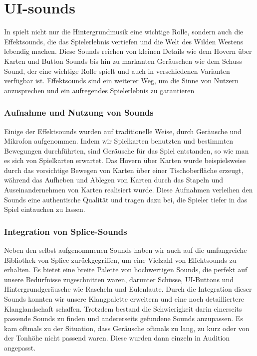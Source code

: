 
\section{UI-sounds}\label{sec:ui-sounds}

\renewcommand{\kapitelautor}{Autor: Nils Hubmann}

%
In \ff spielt nicht nur die Hintergrundmusik eine wichtige Rolle, sondern auch die Effektsounds, die das Spielerlebnis vertiefen und die Welt des Wilden Westens lebendig machen.
Diese Sounds reichen von kleinen Details wie dem Hovern über Karten und Button Sounds bis hin zu markanten Geräuschen wie dem Schuss Sound, der eine wichtige Rolle spielt und auch in verschiedenen Varianten verfügbar ist.
Effektsounds sind ein weiterer Weg, um die Sinne von Nutzern anzusprechen und ein aufregendes Spielerlebnis zu garantieren

\subsubsection{Aufnahme und Nutzung von Sounds}\label{subsubsec:Sound-Aufnahme}
Einige der Effektsounds wurden auf traditionelle Weise, durch Geräusche und Mikrofon aufgenommen. Indem wir Spielkarten benutzten und bestimmten Bewegungen durchführten, sind Geräusche für das Spiel entstanden, so wie man es sich von Spielkarten erwartet.
Das Hovern über Karten wurde beispielsweise durch das vorsichtige Bewegen von Karten über einer Tischoberfläche erzeugt, während das Aufheben und Ablegen von Karten durch das Stapeln und Auseinandernehmen von Karten realisiert wurde.
Diese Aufnahmen verleihen den Sounds eine authentische Qualität und tragen dazu bei, die Spieler tiefer in das Spiel eintauchen zu lassen.

\subsubsection{Integration von Splice-Sounds}\label{subsubsec:Splice-Sounds}
Neben den selbst aufgenommenen Sounds haben wir auch auf die umfangreiche Bibliothek von Splice zurückgegriffen, um eine Vielzahl von Effektsounds zu erhalten.
Es bietet eine breite Palette von hochwertigen Sounds, die perfekt auf unsere Bedürfnisse zugeschnitten waren, darunter Schüsse, UI-Buttons und Hintergrundgeräusche wie Rascheln und Eulenlaute.
Durch die Integration dieser Sounds konnten wir unsere Klangpalette erweitern und eine noch detailliertere Klanglandschaft schaffen.
Trotzdem bestand die Schwierigkeit darin einerseits passende Sounds zu finden und andererseits gefundene Sounds anzupassen.
Es kam oftmals zu der Situation, dass Geräusche oftmals zu lang, zu kurz oder von der Tonhöhe nicht passend waren. Diese wurden dann einzeln in Audition angepasst.

